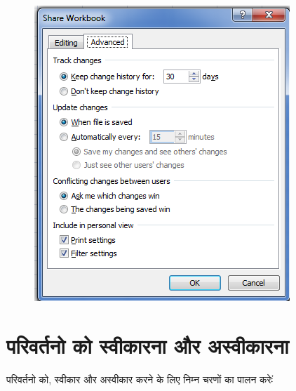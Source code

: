 \begin{figure}[H]
\centering
\includegraphics[scale=0.5]{src/images/chapter1/chapter1_fig70.png}
\end{figure}				
					
\section{परिवर्तनो को स्वीकारना और अस्वीकारना}\label{id-1.42}

परिवर्तनो को, स्वीकार और अस्वीकार करने के लिए निम्न चरणों का पालन करेःं


